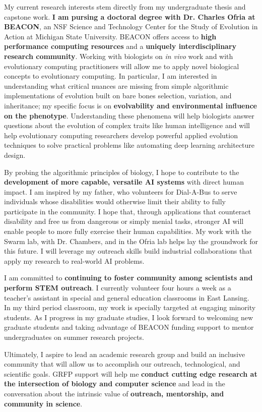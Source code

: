 \noindent
\underline{}
My current research interests stem directly from my undergraduate thesis and capstone work.
\textbf{I am pursing a doctoral degree with Dr. Charles Ofria at BEACON}, an NSF Science and Technology Center for the Study of Evolution in Action at Michigan State University.
BEACON offers access to \textbf{high performance computing resources} and a \textbf{uniquely interdisciplinary research community}.
Working with biologists on \textit{in vivo} work and with evolutionary computing practitioners will allow me to apply novel biological concepts to evolutionary computing.
In particular, I am interested in understanding what critical nuances are missing from simple algorithmic implementations of evolution built on bare bones selection, variation, and inheritance;
my specific focus is on \textbf{evolvability and environmental influence on the phenotype}.
Understanding these phenomena will help biologists answer questions about the evolution of complex traits like human intelligence and will help evolutionary computing researchers develop powerful applied evolution techniques to solve practical problems like automating deep learning architecture design.

By probing the algorithmic principles of biology, I hope to contribute to the \textbf{development of more capable, versatile AI systems} with direct human impact.
I am inspired by my father, who volunteers for Dial-A-Bus to serve individuals whose disabilities would otherwise limit their ability to fully participate in the community.
I hope that, through applications that counteract disability and free us from dangerous or simply menial tasks, stronger AI will enable people to more fully exercise their human capabilities.
My work with the Swarm lab, with Dr. Chambers, and in the Ofria lab helps lay the groundwork for this future.
I will leverage my outreach skills build industrial collaborations that apply my research to real-world AI problems.

I am committed to \textbf{continuing to foster community among scientists and perform STEM outreach}.
I currently volunteer four hours a week as a teacher's assistant in special and general education classrooms in East Lansing.
In my third period classroom, my work is specially targeted at engaging minority students.
As I progress in my graduate studies, I look forward to welcoming new graduate students and taking advantage of BEACON funding support to mentor undergraduates on summer research projects.

Ultimately, I aspire to lead an academic research group and build an inclusive community that will allow us to accomplish our outreach, technological, and scientific goals.
GRFP support will help me \textbf{conduct cutting edge research at the intersection of biology and computer science} and lead in the conversation about the intrinsic value of \textbf{outreach, mentorship, and community in science}.
